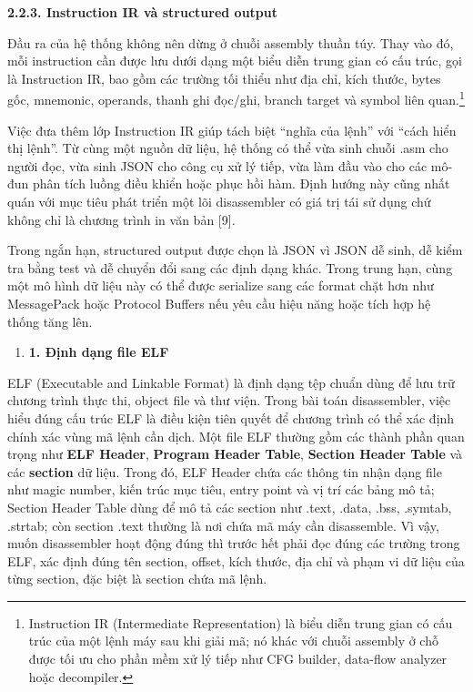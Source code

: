 \documentclass[
]{article}
\begin{document}
\textbf{2.2.3. Instruction IR và structured output}

Đầu ra của hệ thống không nên dừng ở chuỗi assembly thuần túy. Thay vào
đó, mỗi instruction cần được lưu dưới dạng một biểu diễn trung gian có
cấu trúc, gọi là Instruction IR, bao gồm các trường tối thiểu như địa
chỉ, kích thước, bytes gốc, mnemonic, operands, thanh ghi đọc/ghi,
branch target và symbol liên quan.\footnote{Instruction IR (Intermediate
  Representation) là biểu diễn trung gian có cấu trúc của một lệnh máy
  sau khi giải mã; nó khác với chuỗi assembly ở chỗ được tối ưu cho phần
  mềm xử lý tiếp như CFG builder, data-flow analyzer hoặc decompiler.}

Việc đưa thêm lớp Instruction IR giúp tách biệt ``nghĩa của lệnh'' với
``cách hiển thị lệnh''. Từ cùng một nguồn dữ liệu, hệ thống có thể vừa
sinh chuỗi .asm cho người đọc, vừa sinh JSON cho công cụ xử lý tiếp, vừa
làm đầu vào cho các mô-đun phân tích luồng điều khiển hoặc phục hồi hàm.
Định hướng này cũng nhất quán với mục tiêu phát triển một lõi
disassembler có giá trị tái sử dụng chứ không chỉ là chương trình in văn
bản {[}9{]}.

Trong ngắn hạn, structured output được chọn là JSON vì JSON dễ sinh, dễ
kiểm tra bằng test và dễ chuyển đổi sang các định dạng khác. Trong trung
hạn, cùng một mô hình dữ liệu này có thể được serialize sang các format
chặt hơn như MessagePack hoặc Protocol Buffers nếu yêu cầu hiệu năng
hoặc tích hợp hệ thống tăng lên.

\begin{enumerate}
\def\labelenumi{\arabic{enumi}.}
\item
  \textbf{1. Định dạng file ELF}
\end{enumerate}

ELF (Executable and Linkable Format) là định dạng tệp chuẩn dùng để lưu
trữ chương trình thực thi, object file và thư viện. Trong bài toán
disassembler, việc hiểu đúng cấu trúc ELF là điều kiện tiên quyết để
chương trình có thể xác định chính xác vùng mã lệnh cần dịch. Một file
ELF thường gồm các thành phần quan trọng như \textbf{ELF Header},
\textbf{Program Header Table}, \textbf{Section Header Table} và các
\textbf{section} dữ liệu. Trong đó, ELF Header chứa các thông tin nhận
dạng file như magic number, kiến trúc mục tiêu, entry point và vị trí
các bảng mô tả; Section Header Table dùng để mô tả các section như
.text, .data, .bss, .symtab, .strtab; còn section .text thường là nơi
chứa mã máy cần disassemble. Vì vậy, muốn disassembler hoạt động đúng
thì trước hết phải đọc đúng các trường trong ELF, xác định đúng tên
section, offset, kích thước, địa chỉ và phạm vi dữ liệu của từng
section, đặc biệt là section chứa mã lệnh.
\end{document}
